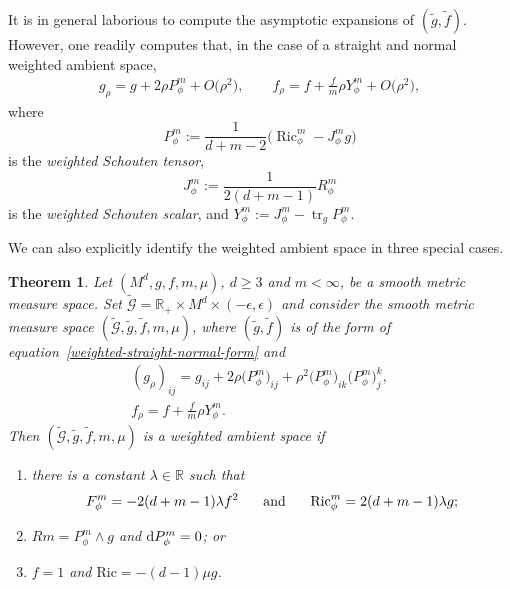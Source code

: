\documentclass[pdftex]{sigma}
\DeclareMathOperator{\tr}{tr}
\DeclareMathOperator{\Ric}{Ric}
\numberwithin{equation}{section}
\newtheorem{Theorem}{Theorem}[section]
\begin{document}
It is in general laborious to compute the asymptotic expansions of $(\widetilde{g},\widetilde{f})$.
However, one readily computes that, in the case of a straight and normal weighted ambient space,
\begin{gather*}
 g_\rho = g + 2\rho P_\phi^m+O\big(\rho^2\big), \qquad
 f_\rho = f + \frac{f}{m}\rho Y_\phi^m +O\big(\rho^2\big),
\end{gather*}
where
\begin{equation*}
 P_\phi^m := \frac{1}{d+m-2}\bigl( \Ric_\phi^m - J_\phi^m g\bigr)
\end{equation*}
is the \emph{weighted Schouten tensor},
\begin{equation*}
 J_\phi^m := \frac{1}{2(d+m-1)}R_\phi^m
\end{equation*}
is the \emph{weighted Schouten scalar}, and $Y_\phi^m := J_\phi^m - \tr_g P_\phi^m$.

We can also explicitly identify the weighted ambient space in three special cases.

\begin{Theorem}
 \label{examples-theorem}
Let $(M^d,g,f,m,\mu)$, $d\geq 3$ and $m<\infty$, be a smooth metric measure space. Set $\widetilde{\mathcal{G}}=\mathbb{R}_+\times M^d\times (-\epsilon,\epsilon)$ and consider the smooth metric measure space $(\widetilde{\mathcal{G}},\widetilde{g},\widetilde{f},m,\mu)$, where $(\widetilde{g},\widetilde{f})$ is of the form of equation~\eqref{weighted-straight-normal-form} and
\begin{gather*}
(g_{\rho})_{i j}=g_{i j}+2\rho\big(P_{\phi}^{m}\big)_{i j} +\rho^{2}\big(P_{\phi}^{m}\big)_{i k}\big(P_{\phi}^{m}\big)_{j}^{k},
\\
f_{\rho}=f+ \frac{f}{m}\rho Y_{\phi}^{m}.
\end{gather*}
Then $(\widetilde{\mathcal{G}},\widetilde{g},\widetilde{f},m,\mu)$ is a weighted ambient space if
\begin{enumerate}[label=$(\roman*)$]\itemsep=0pt
\item \label{Theorem 1.2-1} there is a constant $\lambda\in\mathbb{R}$ such that
\[
F_{\phi}^{m}=- 2(d+m-1)\lambda f^{2}\hspace{5mm} \text { and }\hspace{5mm} \mathrm{Ric}_{\phi}^{m}= 2(d+m-1)\lambda g;
\]

\item \label{Theorem 1.2-2} $Rm=P_\phi^m\wedge g$ and ${\rm d}P_\phi^m=0$; or

\item \label{Theorem 1.2-3} $f=1$ and $\mathrm{Ric}=-(d-1)\mu g$.
\end{enumerate}
\end{Theorem}
\end{document}
